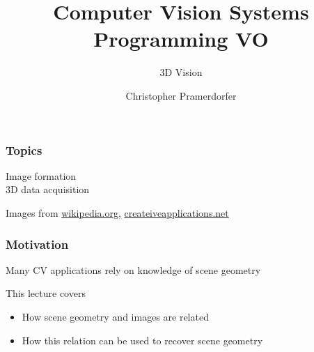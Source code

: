 \documentclass[xetex,professionalfont]{beamer}
\title{Computer Vision Systems Programming VO}
\subtitle{3D Vision}
\author{Christopher Pramerdorfer}
\institute{Computer Vision Lab, Vienna University of Technology}
\begin{document}

\begin{frame}
\maketitle
\end{frame}


\begin{frame}
\frametitle{Topics}

Image formation\\\medskip
3D data acquisition

\bigskip
\begin{center}
    {\centering Images from \url{wikipedia.org}, \url{createiveapplications.net}}
\end{center}

\end{frame}


\begin{frame}
\frametitle{Motivation}

Many CV applications rely on knowledge of scene geometry

\bigskip
This lecture covers
\begin{itemize}
    \item How scene geometry and images are related
    \item How this relation can be used to recover scene geometry %
\end{itemize}

\end{frame}

\end{document}
